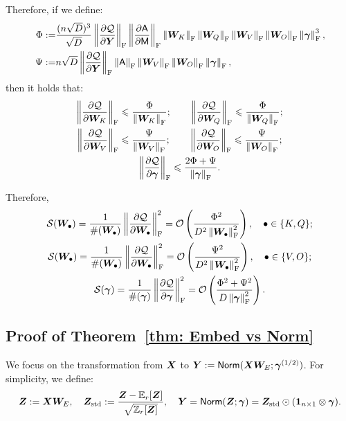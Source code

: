 Therefore, if we define:
\begin{align*}
    \Phi:=&\frac{(n\sqrt{D})^3}{\sqrt{D}}\norm{\frac{\partial \cQ}{\partial\bY}}_\rF\norm{\frac{\partial\ASA}{\partial\MSA}}_\rF\norm{\bW_K}_\rF\norm{\bW_Q}_\rF\norm{\bW_V}_\rF\norm{\bW_O}_\rF\norm{\bgamma}_\rF^3,\\
    \Psi:=&n\sqrt{D}\norm{\frac{\partial \cQ}{\partial\bY}}_\rF\norm{\ASA}_\rF\norm{\bW_V}_\rF\norm{\bW_O}_\rF\norm{\bgamma}_\rF,
\end{align*}
then it holds that:
\begin{gather*}
    \norm{\frac{\partial \cQ}{\partial\bW_{K}}}_\rF\leq\frac{\Phi}{\norm{\bW_K}_\rF};\quad\quad
    \norm{\frac{\partial \cQ}{\partial\bW_{Q}}}_\rF\leq\frac{\Phi}{\norm{\bW_Q}_\rF};
    \\
    \norm{\frac{\partial \cQ}{\partial\bW_{V}}}_\rF\leq\frac{\Psi}{\norm{\bW_V}_\rF};\quad\quad
    \norm{\frac{\partial \cQ}{\partial\bW_{O}}}_\rF\leq\frac{\Psi}{\norm{\bW_O}_\rF};
    \\
    \norm{\frac{\partial \cQ}{\partial\bgamma}}_\rF\leq\frac{2\Phi + \Psi}{\norm{\bgamma}_\rF}.
\end{gather*}


Therefore,
\begin{gather*}
    \cS(\bW_{\bullet})=\frac{1}{\#(\bW_{\bullet})}\norm{\frac{\partial \cQ}{\partial\bW_{\bullet}}}_\rF^2=\cO\left(\frac{\Phi^2}{D^2\norm{\bW_\bullet}_\rF^2}\right),\quad\bullet\in\{K,Q\};
    \\
    \cS(\bW_{\bullet})=\frac{1}{\#(\bW_{\bullet})}\norm{\frac{\partial \cQ}{\partial\bW_{\bullet}}}_\rF^2=\cO\left(\frac{\Psi^2}{D^2\norm{\bW_\bullet}_\rF^2}\right),\quad\bullet\in\{V,O\};
    \\
    \cS(\bgamma)=\frac{1}{\#(\bgamma)}\norm{\frac{\partial \cQ}{\partial\bgamma}}_\rF^2=\cO\left(\frac{\Phi^2+\Psi^2}{D\norm{\bgamma}_\rF^2}\right).
\end{gather*}




\subsection{Proof of Theorem~\ref{thm: Embed vs Norm}}
\label{appendix: proof: thm: Embed vs Norm}

We focus on the transformation from $\bX$ to $\bY:=\LN(\bX\bW_E;\bgamma^{(1/2)})$.
For simplicity, we define:
\begin{align*}
    \bZ:=\bX\bW_E,\quad
    \bZ_{\rm std}:=\frac{\bZ-\bbE_r[\bZ]}{\sqrt{\bbZ_r[\bZ]}},\quad
    \bY=\LN(\bZ;\bgamma)=\bZ_{\rm std}\odot(\bone_{n\times 1}\otimes\bgamma).
\end{align*}

